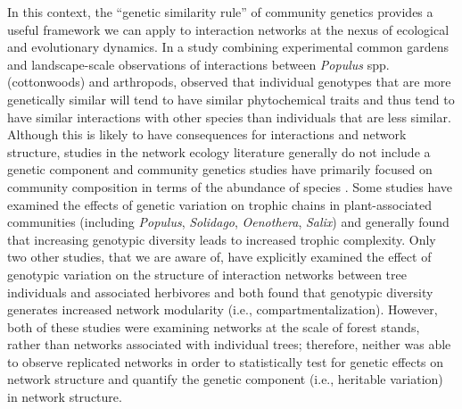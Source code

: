 \documentclass[fleqn,12pt]{olplainarticle}
\begin{document}
In this context, the ``genetic similarity rule'' of community genetics
provides a useful framework we can apply to interaction networks at
the nexus of ecological and evolutionary dynamics. In a study
combining experimental common gardens and landscape-scale observations
of interactions between \textit{Populus} spp.  (cottonwoods) and
arthropods, \cite{Bangert2006} observed that individual genotypes that
are more genetically similar will tend to have similar phytochemical
traits and thus tend to have similar interactions with other species
than individuals that are less similar. Although this is likely to
have consequences for interactions and network structure, studies in
the network ecology literature generally do not include a genetic
component \citep{Lau2017a} and community genetics studies have
primarily focused on community composition in terms of the abundance
of species \citep{DesRoches2018TheVariation}. Some studies have
examined the effects of genetic variation on trophic chains in
plant-associated communities (including \textit{Populus},
\textit{Solidago}, \textit{Oenothera}, \textit{Salix})
\citep{Bailey2005ImportanceInteractions, Johnson2008, Smith2011,
  Smith2015b, Barbour2016GeneticComplexity} and generally found that
increasing genotypic diversity leads to increased trophic
complexity. Only two other studies, that we are aware of, have
explicitly examined the effect of genotypic variation on the structure
of interaction networks between tree individuals and associated
herbivores \citep{Lau2016afix, Keith2017} and both found that genotypic
diversity generates increased network modularity (i.e.,
compartmentalization).  However, both of these studies were examining
networks at the scale of forest stands, rather than networks
associated with individual trees; therefore, neither was able to
observe replicated networks in order to statistically test for genetic
effects on network structure and quantify the genetic component (i.e.,
heritable variation) in network structure.
\end{document}
